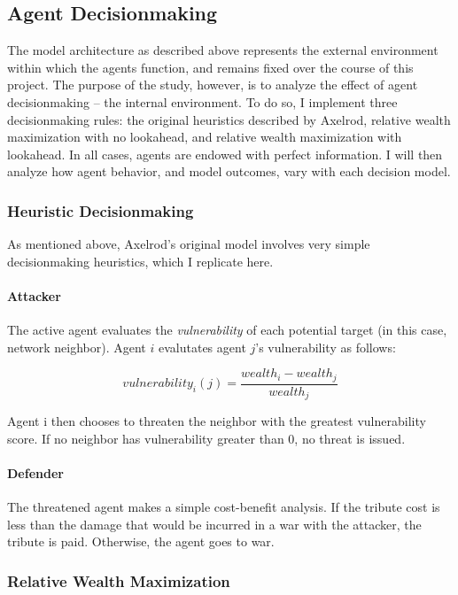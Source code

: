 \documentclass{article}
\begin{document}
\subsection{Agent Decisionmaking}
The model architecture as described above represents the external environment within which the agents function, and remains fixed over the course of this project. The purpose of the study, however, is to analyze the effect of agent decisionmaking -- the internal environment. To do so, I implement three decisionmaking rules: the original heuristics described by Axelrod, relative wealth maximization with no lookahead, and relative wealth maximization with lookahead. In all cases, agents are endowed with perfect information.  I will then analyze how agent behavior, and model outcomes, vary with each decision model.

\subsubsection{Heuristic Decisionmaking}

As mentioned above, Axelrod's original model involves very simple decisionmaking heuristics, which I replicate here. 

\paragraph{Attacker}
The active agent evaluates the \emph{vulnerability} of each potential target (in this case, network neighbor). Agent $i$ evalutates agent $j$'s vulnerability as follows:

\begin{equation}
vulnerability_{i}(j)=\frac{wealth_i - wealth_j}{wealth_j}
\end{equation}

Agent i then chooses to threaten the neighbor with the greatest vulnerability score. If no neighbor has vulnerability greater than 0, no threat is issued.

\paragraph{Defender}
The threatened agent makes a simple cost-benefit analysis. If the tribute cost is less than the damage that would be incurred in a war with the attacker, the tribute is paid. Otherwise, the agent goes to war. 

\subsubsection{Relative Wealth Maximization}
\end{document}
